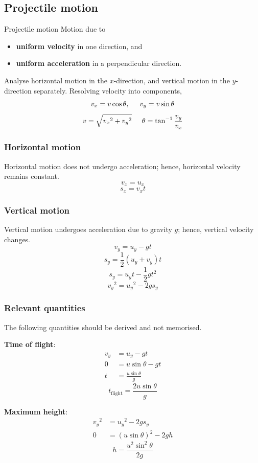 \subsection{Projectile motion}
\begin{defn}{Projectile motion}{}
Motion due to
\begin{itemize}
\item \textbf{uniform velocity} in one direction, and
\item \textbf{uniform acceleration} in a perpendicular direction.
\end{itemize}
\end{defn}

Analyse horizontal motion in the $x$-direction, and vertical motion in the $y$-direction separately. Resolving velocity into components,
\[ v_x = v \cos \theta, \hspace{0.5cm} v_y = v \sin \theta \]
\[ v = \sqrt{{v_x}^2+{v_y}^2} \hspace{0.5cm} \theta = \tan^{-1} \frac{v_y}{v_x} \]

\subsubsection{Horizontal motion}
Horizontal motion does not undergo acceleration; hence, horizontal velocity remains constant.
\[ v_x = u_x \]
\[ s_x = v_x t \]

\subsubsection{Vertical motion}
Vertical motion undergoes acceleration due to gravity $g$; hence, vertical velocity changes.
\[ v_y = u_y - gt \]
\[ s_y = \frac{1}{2} (u_y + v_y) t \]
\[ s_y = u_y t - \frac{1}{2} g t^2 \]
\[ {v_y}^2 = {u_y}^2 - 2gs_y \]

\subsubsection{Relevant quantities}
The following quantities should be derived and not memorised.

\textbf{Time of flight}:
\begin{align*}
v_y &= u_y - gt \\
0 &= u \sin \theta  - gt \\
t &= \frac{u \sin \theta}{g}
\end{align*}
\[ \boxed{t_{\text{flight}} = \frac{2u \sin \theta}{g}} \]

\textbf{Maximum height}:
\begin{align*}
{v_y}^2 &= {u_y}^2 - 2gs_y \\
0 &= (u \sin \theta)^2 - 2gh
\end{align*}
\[ \boxed{h = \frac{u^2 \sin^2 \theta}{2g}} \]

